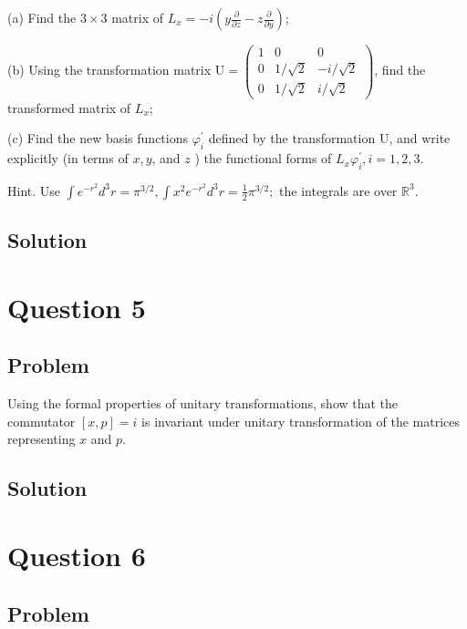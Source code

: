 \documentclass[12pt]{article}
\begin{document}
(a) Find the \(3 \times 3\) matrix of \(L_x=-i\left(y \frac{\partial}{\partial z}-z \frac{\partial}{\partial y}\right)\);

(b) Using the transformation matrix \(\mathrm{U}=\left(\begin{array}{ccc}1 & 0 & 0 \\ 0 & 1 / \sqrt{2} & -i / \sqrt{2} \\ 0 & 1 / \sqrt{2} & i / \sqrt{2}\end{array}\right)\), find the transformed matrix of \(L_x\);

(c) Find the new basis functions \(\varphi_i^{\prime}\) defined by the transformation \(\mathrm{U}\), and write explicitly (in terms of \(x, y\), and \(z\) ) the functional forms of \(L_x \varphi_i^{\prime}, i=1,2,3\).

Hint. Use \(\int e^{-r^2} d^3 r=\pi^{3 / 2}, \int x^2 e^{-r^2} d^3 r=\frac{1}{2} \pi^{3 / 2} ;\) the integrals are over \(\mathbb{R}^3\).

\subsection{Solution}



\newpage
\section{Question 5}

\subsection{Problem}

Using the formal properties of unitary transformations, show that the commutator \([x, p]=i\) is invariant under unitary transformation of the matrices representing \(x\) and \(p\).

\subsection{Solution}



\newpage
\section{Question 6}

\subsection{Problem}
\end{document}

